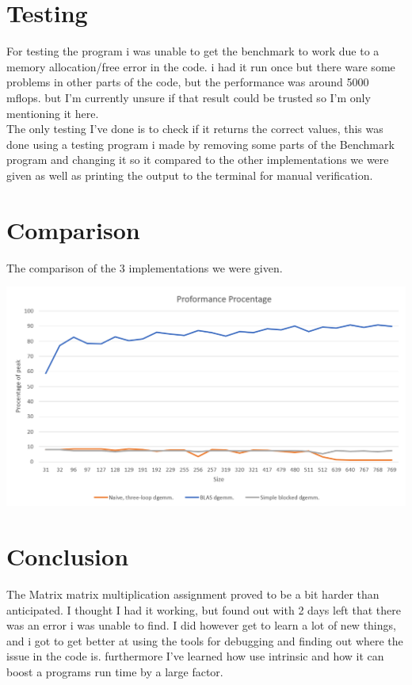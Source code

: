 \documentclass[a4paper,10pt,titlepage]{report}
\begin{document}
\section{Testing}
For testing the program i was unable to get the benchmark to work due to a memory allocation/free error in the code. i had it run once but there ware some problems 
in other parts of the code, but the performance was around 5000 mflops. but I'm currently unsure if that result could be trusted so I'm only mentioning it here.\\

The only testing I've done is to check if it returns the correct values, this was done using a testing program i made by removing some parts of the Benchmark program and changing it so it compared to the other implementations we were given as well as printing the output to the terminal for manual verification.

\section{Comparison}
The comparison of the 3 implementations we were given.


\includegraphics[scale=0.3]{procentage}

\section{Conclusion}
The Matrix matrix multiplication assignment proved to be a bit harder than anticipated. I thought I had it working, but found out with 2 days left that there was an error i was unable to find. I did however get to learn a lot of new things, and i got to get better at using the tools for debugging and finding out where the issue in the code is. furthermore I've learned how use intrinsic and how it can boost a programs run time by a large factor.
\end{document}
